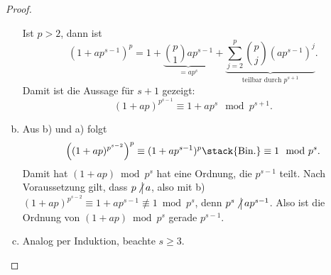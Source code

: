 \begin{lem}
\begin{proof}
\begin{enumerate}[a)]
				Ist $p > 2$, dann ist
				\[
					(1 + ap^{s-1})^p
					= 1 + \underbrace{\binom{p}{1} ap^{s-1}}_{= ap^s} + \underbrace{\sum_{j=2}^p \binom{p}{j} (ap^{s-1})^j}_{\text{teilbar durch $p^{s+1}$}}.
				\]
				Damit ist die Aussage für $s + 1$ gezeigt:
				\[
					(1 + ap)^{p^{s-1}}
					\equiv 1 + ap^s \mod p^{s+1}.
				\]
			\item
				Aus b) und a) folgt
				\[
					\Big( (1+ap)^{p^{s-2}} \Big)^p
					\equiv (1 + ap^{s-1})^p
					\stack{\text{Bin.}}\equiv 1 \mod p^s.
				\]
				Damit hat $(1 + ap) \bmod p^s$ hat eine Ordnung, die $p^{s-1}$ teilt.
				Nach Voraussetzung gilt, dass $p \ndivs a$, also mit b) $(1 + ap)^{p^{s-2}} \equiv 1 + ap^{s-1} \not\equiv 1 \bmod p^s$, denn $p^s \ndivs ap^{s-1}$.
				Also ist die Ordnung von $(1 + ap) \bmod p^s$ gerade $p^{s-1}$.
			\item
				Analog per Induktion, beachte $s \ge 3$.
				\Exercise
		\end{enumerate}
	\end{proof}
\end{lem}

